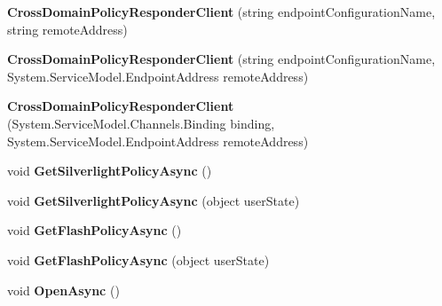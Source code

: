 \begin{DoxyCompactItemize}
\item 
\hypertarget{class_cross_domain_policy_responder_client_a6d7837d62f46c79003208caf6c9e4277}{
{\bfseries CrossDomainPolicyResponderClient} (string endpointConfigurationName, string remoteAddress)}
\label{class_cross_domain_policy_responder_client_a6d7837d62f46c79003208caf6c9e4277}

\item 
\hypertarget{class_cross_domain_policy_responder_client_a736bba2a16e80787c7297484d6f9ddba}{
{\bfseries CrossDomainPolicyResponderClient} (string endpointConfigurationName, System.ServiceModel.EndpointAddress remoteAddress)}
\label{class_cross_domain_policy_responder_client_a736bba2a16e80787c7297484d6f9ddba}

\item 
\hypertarget{class_cross_domain_policy_responder_client_a8597cad92f66c9a1621fbb1d77f488fa}{
{\bfseries CrossDomainPolicyResponderClient} (System.ServiceModel.Channels.Binding binding, System.ServiceModel.EndpointAddress remoteAddress)}
\label{class_cross_domain_policy_responder_client_a8597cad92f66c9a1621fbb1d77f488fa}

\item 
\hypertarget{class_cross_domain_policy_responder_client_a9a085b627bba7b3faef72a4b41a4d1fb}{
void {\bfseries GetSilverlightPolicyAsync} ()}
\label{class_cross_domain_policy_responder_client_a9a085b627bba7b3faef72a4b41a4d1fb}

\item 
\hypertarget{class_cross_domain_policy_responder_client_a4df8f68b1aa165d5032d0f824dc3dc83}{
void {\bfseries GetSilverlightPolicyAsync} (object userState)}
\label{class_cross_domain_policy_responder_client_a4df8f68b1aa165d5032d0f824dc3dc83}

\item 
\hypertarget{class_cross_domain_policy_responder_client_a50b916f19939c792d8720c460117b746}{
void {\bfseries GetFlashPolicyAsync} ()}
\label{class_cross_domain_policy_responder_client_a50b916f19939c792d8720c460117b746}

\item 
\hypertarget{class_cross_domain_policy_responder_client_a4c07ab986ee8a200d441434c1fb81cfa}{
void {\bfseries GetFlashPolicyAsync} (object userState)}
\label{class_cross_domain_policy_responder_client_a4c07ab986ee8a200d441434c1fb81cfa}

\item 
\hypertarget{class_cross_domain_policy_responder_client_a9e5c1d1298125952ed3b99aa402c5af5}{
void {\bfseries OpenAsync} ()}
\label{class_cross_domain_policy_responder_client_a9e5c1d1298125952ed3b99aa402c5af5}


\end{DoxyCompactItemize}
